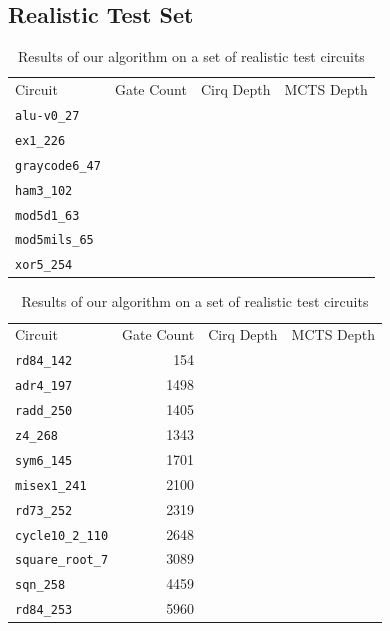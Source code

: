 \documentclass[%
 reprint,
 amsmath,amssymb,
 aps,
]{revtex4-2}
\begin{document}
\subsection{\label{sec:results-realistic}Realistic Test Set}

\begin{table}[H]
    \caption{\label{tab:small-circuits}%
        Results of our algorithm on a set of realistic test circuits
    }
    \begin{ruledtabular}
        \begin{tabular}{lrrr}
            \textrm{Circuit}       &
            \textrm{Gate Count}    &
            \textrm{Cirq Depth}    &
            \textrm{MCTS Depth}             \\
            \colrule

            \verb+alu-v0_27+ &   &  & \\
            \verb+ex1_226+ &   &  & \\
            \verb+graycode6_47+ &   &  & \\
            \verb+ham3_102+ &   &  & \\
            \verb+mod5d1_63+ &   &  & \\
            \verb+mod5mils_65+ &   &  & \\
            \verb+xor5_254+ &   &  & \\
        \end{tabular}
    \end{ruledtabular}
\end{table}


\begin{table}[H]
    \caption{\label{tab:large-circuits}%
        Results of our algorithm on a set of realistic test circuits
    }
    \begin{ruledtabular}
        \begin{tabular}{lrrr}
            \textrm{Circuit}        &
            \textrm{Gate Count}     &
            \textrm{Cirq Depth}     &
            \textrm{MCTS Depth}                 \\
            \colrule

            \verb+rd84_142+  & 154  &  & \\
            \verb+adr4_197+  & 1498 &  & \\
            \verb+radd_250+ & 1405 &  & \\
            \verb+z4_268+ & 1343 &  & \\
            \verb+sym6_145+ & 1701 &  & \\
            \verb+misex1_241+ & 2100 &  & \\
            \verb+rd73_252+ & 2319 &  & \\
            \verb+cycle10_2_110+ & 2648 &  & \\
            \verb+square_root_7+ & 3089 &  & \\
            \verb+sqn_258+ & 4459 &  & \\
            \verb+rd84_253+ & 5960 &  & \\
        \end{tabular}
    \end{ruledtabular}
\end{table}
\end{document}

